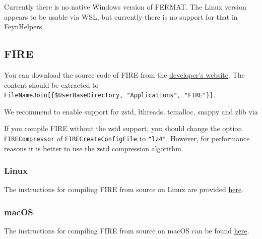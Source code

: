 \documentclass[../FeynHelpersManual.tex]{subfiles}
\begin{document}
Currently there is no native Windows version of FERMAT. The Linux
version appears to be usable via WSL, but currently there is no support
for that in FeynHelpers.

\hypertarget{fire}{%
\subsection{FIRE}\label{fire}}

You can download the source code of FIRE from the
\href{https://bitbucket.org/feynmanIntegrals/fire}{developer's website}.
The content should be extracted to
\texttt{FileNameJoin[\allowbreak{}\{\allowbreak{}\$UserBaseDirectory,\ \allowbreak{}"Applications",\ \allowbreak{}"FIRE"\}]}.

We recommend to enable support for zstd, lthreads, tcmalloc, snappy and
zlib via

\begin{Shaded}
\begin{Highlighting}[]
\SpecialCharTok{/}\SpecialCharTok{{-}{-}}\SpecialCharTok{{-}{-}}\SpecialCharTok{{-}{-}}\SpecialCharTok{{-}{-}}\SpecialCharTok{{-}{-}}
\end{Highlighting}
\end{Shaded}

If you compile FIRE without the zstd support, you should change the
option \texttt{FIRECompressor} of \texttt{FIRECreateConfigFile} to
\texttt{"lz4"}. However, for performance reasons it is better to use the
zstd compression algorithm.

\hypertarget{linux-1}{%
\subsubsection{Linux}\label{linux-1}}

The instructions for compiling FIRE from source on Linux are provided
\href{https://bitbucket.org/feynmanIntegrals/fire/src/master/}{here}.

\hypertarget{macos-1}{%
\subsubsection{macOS}\label{macos-1}}

The instructions for compiling FIRE from source on macOS can be found
\href{https://bitbucket.org/feynmanIntegrals/fire/issues/10/issue-of-the-installation-on-macos}{here}.
\end{document}
